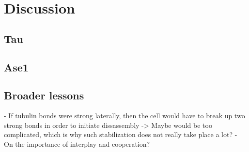 \chapter{Discussion}
\section{Tau}

\section{Ase1}


\section{Broader lessons}

- If tubulin bonds were strong laterally, then the cell would have to break up two strong bonds in order to initiate dissassembly -> Maybe would be too complicated, which is why such stabilization does not really take place a lot?
- On the importance of interplay and cooperation?